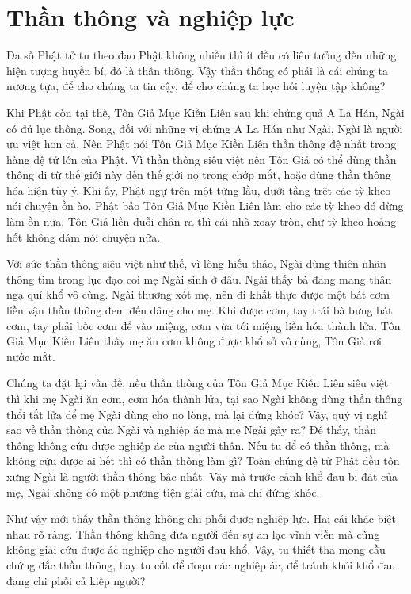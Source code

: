 \documentclass[
  12pt,
  oneside]{book}
\begin{document}
\hypertarget{than-thong-va-nghiep-luc}{%
\chapter*{Thần thông và nghiệp lực}\label{than-thong-va-nghiep-luc}}

Đa số Phật tử tu theo đạo Phật không nhiều thì ít đều có liên tưởng đến những hiện tượng huyền bí, đó là thần thông. Vậy thần thông có phải là cái chúng ta nương tựa, để cho chúng ta tin cậy, để cho chúng ta học hỏi luyện tập không?

Khi Phật còn tại thế, Tôn Giả Mục Kiền Liên sau khi chứng quả A La Hán, Ngài có đủ lục thông. Song, đối với những vị chứng A La Hán như Ngài, Ngài là người ưu việt hơn cả. Nên Phật nói Tôn Giả Mục Kiền Liên thần thông đệ nhất trong hàng đệ tử lớn của Phật. Vì thần thông siêu việt nên Tôn Giả có thể dùng thần thông đi từ thế giới này đến thế giới nọ trong chớp mắt, hoặc dùng thần thông hóa hiện tùy ý. Khi ấy, Phật ngự trên một từng lầu, dưới tầng trệt các tỳ kheo nói chuyện ồn ào. Phật bảo Tôn Giả Mục Kiền Liên làm cho các tỳ kheo đó đừng làm ồn nữa. Tôn Giả liền duỗi chân ra thì cái nhà xoay tròn, chư tỳ kheo hoảng hốt không dám nói chuyện nữa.

Với sức thần thông siêu việt như thế, vì lòng hiếu thảo, Ngài dùng thiên nhãn thông tìm trong lục đạo coi mẹ Ngài sinh ở đâu. Ngài thấy bà đang mang thân ngạ quỉ khổ vô cùng. Ngài thương xót mẹ, nên đi khất thực được một bát cơm liền vận thần thông đem đến dâng cho mẹ. Khi được cơm, tay trái bà bưng bát cơm, tay phải bốc cơm để vào miệng, cơm vừa tới miệng liền hóa thành lửa. Tôn Giả Mục Kiền Liên thấy mẹ ăn cơm không được khổ sở vô cùng, Tôn Giả rơi nước mắt.

Chúng ta đặt lại vấn đề, nếu thần thông của Tôn Giả Mục Kiền Liên siêu việt thì khi mẹ Ngài ăn cơm, cơm hóa thành lửa, tại sao Ngài không dùng thần thông thổi tắt lửa để mẹ Ngài dùng cho no lòng, mà lại đứng khóc? Vậy, quý vị nghĩ sao về thần thông của Ngài và nghiệp ác mà mẹ Ngài gây ra? Để thấy, thần thông không cứu được nghiệp ác của người thân. Nếu tu để có thần thông, mà không cứu được ai hết thì có thần thông làm gì? Toàn chúng đệ tử Phật đều tôn xưng Ngài là người thần thông bậc nhất. Vậy mà trước cảnh khổ đau bi đát của mẹ, Ngài không có một phương tiện giải cứu, mà chỉ đứng khóc.

Như vậy mới thấy thần thông không chi phối được nghiệp lực. Hai cái khác biệt nhau rõ ràng. Thần thông không đưa người đến sự an lạc vĩnh viễn mà cũng không giải cứu được ác nghiệp cho người đau khổ. Vậy, tu thiết tha mong cầu chứng đắc thần thông, hay tu cốt để đoạn các nghiệp ác, để tránh khỏi khổ đau đang chi phối cả kiếp người?
\end{document}
